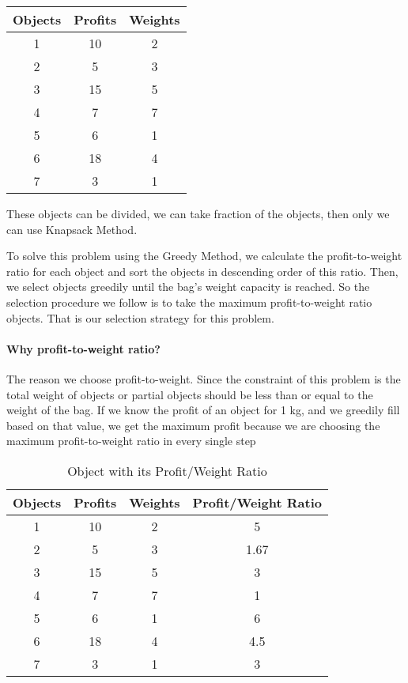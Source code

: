 \documentclass[11pt, a4paper]{article}
\begin{document}
\begin{table}[H]
    \centering
    \begin{tabular}{|c|c|c|}
    \hline
    \textbf{Objects} & \textbf{Profits} & \textbf{Weights}\\
    \hline
    1 & 10 & 2\\
    2 & 5 & 3\\
    3 & 15& 5\\
    4 & 7& 7\\
    5 & 6& 1\\
    6 & 18& 4\\
    7 & 3& 1\\
    \hline
    \end{tabular}
\end{table}

These objects can be divided, we can take fraction of the objects, then only we can use Knapsack Method.

To solve this problem using the Greedy Method, we calculate the profit-to-weight ratio for each object and sort the objects in descending order of this ratio. Then, we select objects greedily until the bag's weight capacity is reached. So the selection procedure we follow is to take the maximum profit-to-weight ratio objects. That is our selection strategy for this problem. 
\paragraph{Why profit-to-weight ratio?} 
The reason we choose profit-to-weight. Since the constraint of this problem is the total weight of objects or partial objects should be less than or equal to the weight of the bag. If we know the profit of an object for 1 kg, and we greedily fill based on that value, we get the maximum profit because we are choosing the maximum profit-to-weight ratio in every single step

\begin{table}[H]
    \centering
    \begin{tabular}{|c|c|c|c|}
    \hline
    \textbf{Objects} & \textbf{Profits} & \textbf{Weights} & \textbf{Profit/Weight Ratio}\\
    \hline
    1 & 10 & 2 & 5\\
    2 & 5 & 3 & 1.67\\
    3 & 15 & 5 & 3\\
    4 & 7 & 7 & 1\\
    5 & 6 & 1 & 6\\
    6 & 18 & 4 & 4.5\\
    7 & 3 & 1 & 3\\
    \hline
    \end{tabular}
    \caption{Object with its Profit/Weight Ratio}
\end{table}
\end{document}
